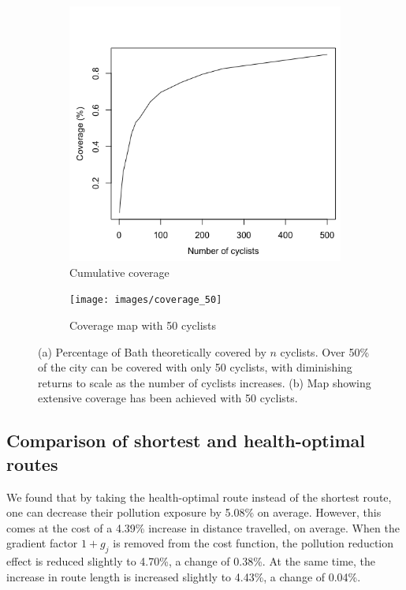 \documentclass[11pt,twosided,a4paper]{report}
\begin{document}
\begin{figure}[!tb]
\centering
\begin{subfigure}[b]{0.49\textwidth}
  \includegraphics[width=1\linewidth]{images/coverage}
  \caption{Cumulative coverage}
  \label{fig:coverage}
\end{subfigure}
\hfill
\begin{subfigure}[b]{0.49\textwidth}
  \texttt{[image: images/coverage\_50]}
  \caption{Coverage map with 50 cyclists}
  \label{fig:coverage_50}
\end{subfigure}
\caption[Cyclist coverage.]{ (a) Percentage of Bath theoretically covered by $n$ cyclists. Over 50\% of the city can be covered with only 50 cyclists, with diminishing returns to scale as the number of cyclists increases. (b) Map showing extensive coverage has been achieved with 50 cyclists.}
\label{fig:coverage}
\end{figure}



\subsection{Comparison of shortest and health-optimal routes}

We found that by taking the health-optimal route instead of the shortest route, one can decrease their pollution exposure by 5.08\% on average. However, this comes at the cost of a 4.39\% increase in distance travelled, on average. When the gradient factor $1+g_j$ is removed from the cost function, the pollution reduction effect is reduced slightly to 4.70\%, a change of 0.38\%. At the same time, the increase in route length is increased slightly to 4.43\%, a change of 0.04\%.
\end{document}

